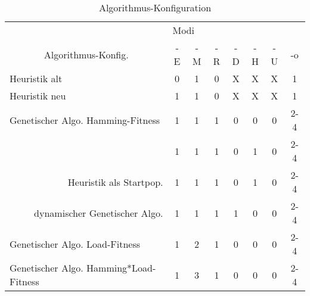 	\begin{table}[htp]
		\centering
		\begin{tabular}{ccccccccc}
			\multicolumn{2}{l}{}                 & \multicolumn{7}{|l}{Modi}                                                               \\ 
			\multicolumn{2}{c}{Algorithmus-Konfig.}  & \multicolumn{1}{|c}{-E} & \multicolumn{1}{c}{-M} & \multicolumn{1}{c}{-R} & \multicolumn{1}{c}{-D} & \multicolumn{1}{c}{-H} & \multicolumn{1}{c}{-U} & \multicolumn{1}{c}{-o} \\ 
			\hline
		\multicolumn{2}{l}{Heuristik alt}  & \multicolumn{1}{|c}{0} & \multicolumn{1}{c}{1} & \multicolumn{1}{c}{0} & \multicolumn{1}{c}{X} & \multicolumn{1}{c}{X} & \multicolumn{1}{c}{X} & \multicolumn{1}{c}{1} \\
		\multicolumn{2}{l}{Heuristik neu}  & \multicolumn{1}{|c}{1} & \multicolumn{1}{c}{1} & \multicolumn{1}{c}{0} & \multicolumn{1}{c}{X} & \multicolumn{1}{c}{X} & \multicolumn{1}{c}{X} & \multicolumn{1}{c}{1} \\ 
		\multicolumn{2}{l}{Genetischer Algo. Hamming-Fitness}  & \multicolumn{1}{|c}{1} & \multicolumn{1}{c}{1} & \multicolumn{1}{c}{1} & \multicolumn{1}{c}{0} & \multicolumn{1}{c}{0} & \multicolumn{1}{c}{0} & \multicolumn{1}{c}{2-4} \\
			\multicolumn{2}{r}{}  & \multicolumn{1}{|c}{1} & \multicolumn{1}{c}{1} & \multicolumn{1}{c}{1} & \multicolumn{1}{c}{0} & \multicolumn{1}{c}{1} & \multicolumn{1}{c}{0} & \multicolumn{1}{c}{2-4} \\
			\multicolumn{2}{r}{Heuristik als Startpop.}  & \multicolumn{1}{|c}{1} & \multicolumn{1}{c}{1} & \multicolumn{1}{c}{1} & \multicolumn{1}{c}{0} & \multicolumn{1}{c}{1} & \multicolumn{1}{c}{0} & \multicolumn{1}{c}{2-4} \\
			\multicolumn{2}{r}{dynamischer Genetischer Algo.}  & \multicolumn{1}{|c}{1} & \multicolumn{1}{c}{1} & \multicolumn{1}{c}{1} & \multicolumn{1}{c}{1} & \multicolumn{1}{c}{0} & \multicolumn{1}{c}{0} & \multicolumn{1}{c}{2-4} \\
		\multicolumn{2}{l}{Genetischer Algo. Load-Fitness}  & \multicolumn{1}{|c}{1} & \multicolumn{1}{c}{2} & \multicolumn{1}{c}{1} & \multicolumn{1}{c}{0} & \multicolumn{1}{c}{0} & \multicolumn{1}{c}{0} & \multicolumn{1}{c}{2-4} \\ 
		\multicolumn{2}{l}{Genetischer Algo. Hamming*Load-Fitness}  & \multicolumn{1}{|c}{1} & \multicolumn{1}{c}{3} & \multicolumn{1}{c}{1} & \multicolumn{1}{c}{0} & \multicolumn{1}{c}{0} & \multicolumn{1}{c}{0} & \multicolumn{1}{c}{2-4}                     
		\end{tabular}
		\newline
		\caption{Algorithmus-Konfiguration}
	\end{table}

